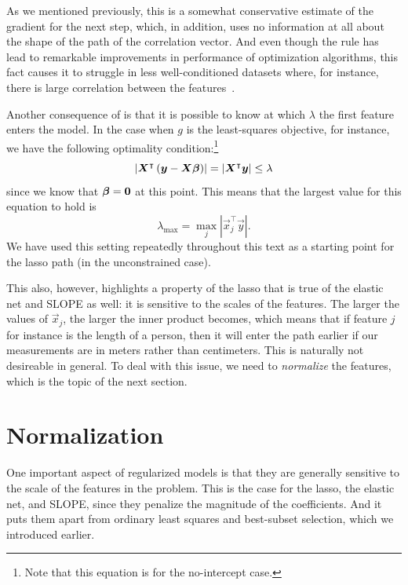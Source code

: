 As we mentioned previously, this is a somewhat conservative estimate of the gradient for the next step, which, in addition, uses no information at all about the shape of the path of the correlation vector. And even though the rule has lead to remarkable improvements in performance of optimization algorithms, this fact causes it to struggle in less well-conditioned datasets where, for instance, there is large correlation between the features~\parencite{tibshirani2012}.

Another consequence of  is that it is possible to know at which \(\lambda\) the first feature enters the model. In the case when \(g\) is the least-squares objective, for instance, we have the following optimality condition:\footnote{Note that this equation is for the no-intercept case.}
\[
  \left|\boldsymbol{X}^\intercal\left(\boldsymbol{y} - \boldsymbol{X}\boldsymbol{\beta}\right)\right| = |\boldsymbol{X}^\intercal \boldsymbol{y}| \leq \lambda
\]
since we know that \(\boldsymbol{\beta} = \boldsymbol{0}\) at this point. This means that the largest value for this equation to hold is
\[
  \lambda_\text{max} = \max_j |\vec{x}_j^\intercal \vec{y}|.
\]
We have used this setting repeatedly throughout this text as a starting point for the lasso path (in the unconstrained case).

This also, however, highlights a property of the lasso that is true of the elastic net and SLOPE as well: it is sensitive to the scales of the features. The larger the values of \(\vec{x}_j\), the larger the inner product  becomes, which means that if feature \(j\) for instance is the length of a person, then it will enter the path earlier if our measurements are in meters rather than centimeters. This is naturally not desireable in general. To deal with this issue, we need to \emph{normalize} the features, which is the topic of the next section.

\section{Normalization}\label{sec:normalization}

One important aspect of regularized models is that they are generally sensitive to the scale of the features in the problem. This is the case for the lasso, the elastic net, and SLOPE, since they penalize the magnitude of the coefficients. And it puts them apart from ordinary least squares and best-subset selection, which we introduced earlier.

